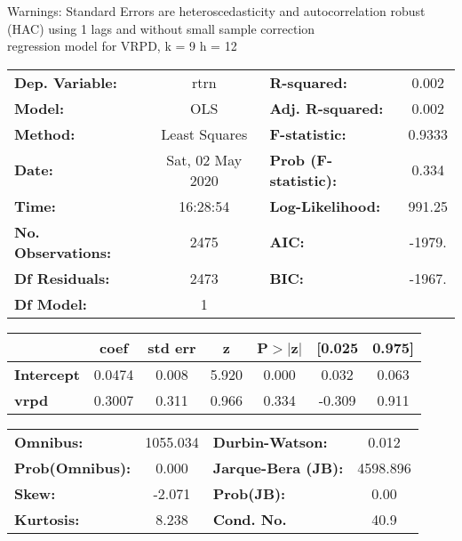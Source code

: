 Warnings: \newline
 [1] Standard Errors are heteroscedasticity and autocorrelation robust (HAC) using 1 lags and without small sample correction\\ 

regression model for VRPD, k = 9 h = 12\begin{center}
\begin{tabular}{lclc}
\toprule
\textbf{Dep. Variable:}    &       rtrn       & \textbf{  R-squared:         } &     0.002   \\
\textbf{Model:}            &       OLS        & \textbf{  Adj. R-squared:    } &     0.002   \\
\textbf{Method:}           &  Least Squares   & \textbf{  F-statistic:       } &    0.9333   \\
\textbf{Date:}             & Sat, 02 May 2020 & \textbf{  Prob (F-statistic):} &    0.334    \\
\textbf{Time:}             &     16:28:54     & \textbf{  Log-Likelihood:    } &    991.25   \\
\textbf{No. Observations:} &        2475      & \textbf{  AIC:               } &    -1979.   \\
\textbf{Df Residuals:}     &        2473      & \textbf{  BIC:               } &    -1967.   \\
\textbf{Df Model:}         &           1      & \textbf{                     } &             \\
\bottomrule
\end{tabular}
\begin{tabular}{lcccccc}
                   & \textbf{coef} & \textbf{std err} & \textbf{z} & \textbf{P$> |$z$|$} & \textbf{[0.025} & \textbf{0.975]}  \\
\midrule
\textbf{Intercept} &       0.0474  &        0.008     &     5.920  &         0.000        &        0.032    &        0.063     \\
\textbf{vrpd}      &       0.3007  &        0.311     &     0.966  &         0.334        &       -0.309    &        0.911     \\
\bottomrule
\end{tabular}
\begin{tabular}{lclc}
\textbf{Omnibus:}       & 1055.034 & \textbf{  Durbin-Watson:     } &    0.012  \\
\textbf{Prob(Omnibus):} &   0.000  & \textbf{  Jarque-Bera (JB):  } & 4598.896  \\
\textbf{Skew:}          &  -2.071  & \textbf{  Prob(JB):          } &     0.00  \\
\textbf{Kurtosis:}      &   8.238  & \textbf{  Cond. No.          } &     40.9  \\
\bottomrule
\end{tabular}
\end{center}

